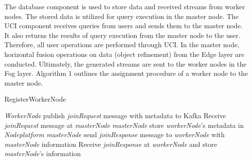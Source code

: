 \documentclass[5p,times]{elsarticle}
\begin{document}
The database component is used to store data and received streams from worker nodes. The stored data is utilized for query execution in the master node. The UCI component receives queries from users and sends them to the master node. It also returns the results of query execution from the master node to the user. Therefore, all user operations are performed through UCI.
In the master node, horizontal fusion operations on data (object refinement) from the Edge layer are conducted. Ultimately, the generated streams are sent to the worker nodes in the Fog layer.
Algorithm 1 outlines the assignment procedure of a worker node to the master node.




\begin{algorithm}
  \caption{RegisterWorkerNode}\label{register_worker_node}
  \begin{algorithmic}[1]
      \State\textit{WorkerNode} publish \textit{joinRequest} message with metadata to Kafka
      \State Receive \textit{joinRequest} message at \textit{masterNode}
      \State \textit{masterNode} store \textit{workerNode}'s metadata in \textit{Nodeplatform}
      \State \textit{masterNode} send \textit{joinResponse} message to \textit{workerNode} with \textit{masterNode} information
      \State Receive \textit{joinResponse} at \textit{workerNode} and store \textit{masterNode}'s information
      \EndProcedure
  \end{algorithmic}
  \end{algorithm}
\end{document}
